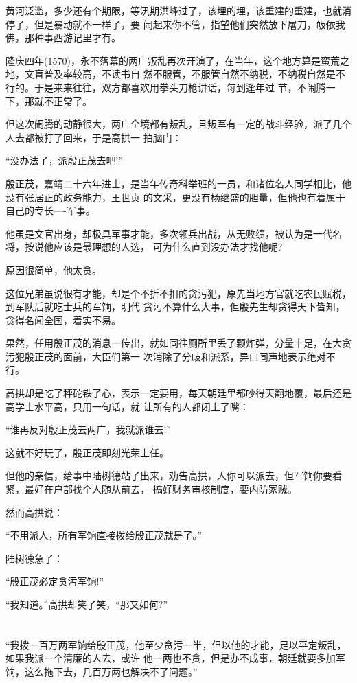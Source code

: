 \documentclass[11pt,a4paper,onecolumn]{article}
\begin{document}
黄河泛滥，多少还有个期限，等汛期洪峰过了，该埋的埋，该重建的重建，也就消停了，但是暴动就不一样了，要
闹起来你不管，指望他们突然放下屠刀，皈依我佛，那种事西游记里才有。

隆庆四年(1570)，永不落幕的两广叛乱再次开演了，在当年，这个地方算是蛮荒之地，文盲普及率较高，不读书自
然不服管，不服管自然不纳税，不纳税自然是不行的。于是来来往往，双方都喜欢用拳头刀枪讲话，每到逢年过
节，不闹腾一下，那就不正常了。

但这次闹腾的动静很大，两广全境都有叛乱，且叛军有一定的战斗经验，派了几个人去都被打了回来，于是高拱一
拍脑门：

``没办法了，派殷正茂去吧!''

殷正茂，嘉靖二十六年进士，是当年传奇科举班的一员，和诸位名人同学相比，他没有张居正的政务能力，王世贞
的文采，更没有杨继盛的胆量，但他也有着属于自己的专长----军事。

他虽是文官出身，却极具军事才能，多次领兵出战，从无败绩，被认为是一代名将，按说他应该是最理想的人选，
可为什么直到没办法才找他呢?

原因很简单，他太贪。

这位兄弟虽说很有才能，却是个不折不扣的贪污犯，原先当地方官就吃农民赋税，到军队后就吃士兵的军饷，明代
贪污不算什么大事，但殷先生却贪得天下皆知，贪得名闻全国，着实不易。

果然，任用殷正茂的消息一传出，就如同往厕所里丢了颗炸弹，分量十足，在大贪污犯殷正茂的面前，大臣们第一
次消除了分歧和派系，异口同声地表示绝对不行。

高拱却是吃了秤砣铁了心，表示一定要用，每天朝廷里都吵得天翻地覆，最后还是高学士水平高，只用一句话，就
让所有的人都闭上了嘴：

``谁再反对殷正茂去两广，我就派谁去!''

这就不好玩了，殷正茂即刻光荣上任。

但他的亲信，给事中陆树德站了出来，劝告高拱，人你可以派去，但军饷你要看紧，最好在户部找个人随从前去，
搞好财务审核制度，要内防家贼。

然而高拱说：

``不用派人，所有军饷直接拨给殷正茂就是了。''

陆树德急了：

``殷正茂必定贪污军饷!''

``我知道。''高拱却笑了笑，``那又如何?''

\section[\thesection]{}

``我拨一百万两军饷给殷正茂，他至少贪污一半，但以他的才能，足以平定叛乱，如果我派一个清廉的人去，或许
他一两也不贪，但是办不成事，朝廷就要多加军饷，这么拖下去，几百万两也解决不了问题。''
\end{document}

